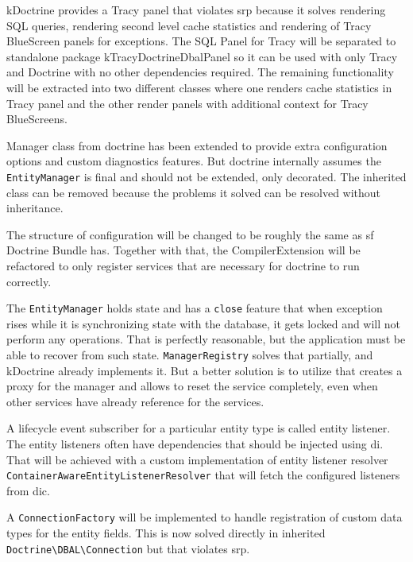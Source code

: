 \gls{kDoctrine} provides a Tracy panel that violates \gls{srp} because it solves rendering SQL queries, rendering second level cache statistics and rendering of Tracy BlueScreen panels for exceptions. The SQL Panel for Tracy will be separated to standalone package \gls{kTracyDoctrineDbalPanel} so it can be used with only Tracy and Doctrine with no other dependencies required. The remaining functionality will be extracted into two different classes where one renders cache statistics in Tracy panel and the other render panels with additional context for Tracy BlueScreens.

Manager class from \gls{doctrine} has been extended to provide extra configuration options and custom diagnostics features. But \gls{doctrine} internally assumes the \lstinline{EntityManager} is final and should not be extended, only decorated. The inherited class can be removed because the problems it solved can be resolved without inheritance.

The structure of configuration will be changed to be roughly the same as \gls{sf} Doctrine Bundle has. Together with that, the CompilerExtension will be refactored to only register services that are necessary for \gls{doctrine} to run correctly.

The \lstinline{EntityManager} holds state and has a \lstinline{close} feature that when exception rises while it is synchronizing state with the database, it gets locked and will not perform any operations. That is perfectly reasonable, but the application must be able to recover from such state. \lstinline{ManagerRegistry} solves that partially, and \gls{kDoctrine} already implements it. But a better solution is to utilize  that creates a proxy for the manager and allows to reset the service completely, even when other services have already reference for the services.

A lifecycle event subscriber for a particular entity type is called entity listener. The entity listeners often have dependencies that should be injected using \gls{di}. That will be achieved with a custom implementation of entity listener resolver \lstinline{ContainerAwareEntityListenerResolver} that will fetch the configured listeners from \gls{dic}.

A \lstinline{ConnectionFactory} will be implemented to handle registration of custom data types for the entity fields. This is now solved directly in inherited \lstinline{Doctrine\DBAL\Connection} but that violates \gls{srp}.

